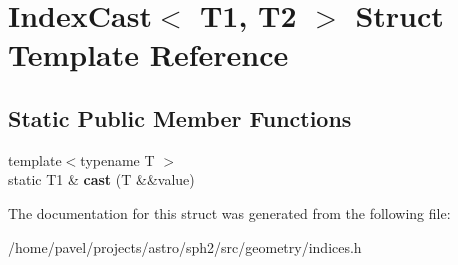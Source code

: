 \hypertarget{structIndexCast}{}\section{Index\+Cast$<$ T1, T2 $>$ Struct Template Reference}
\label{structIndexCast}
\subsection*{Static Public Member Functions}
\begin{DoxyCompactItemize}
\item 
\hypertarget{structIndexCast_a4649faea0aea9ac405862853b3a4c748}{}\label{structIndexCast_a4649faea0aea9ac405862853b3a4c748} 
{\footnotesize template$<$typename T $>$ }\\static T1 \& {\bfseries cast} (T \&\&value)
\end{DoxyCompactItemize}


The documentation for this struct was generated from the following file\+:\begin{DoxyCompactItemize}
\item 
/home/pavel/projects/astro/sph2/src/geometry/indices.\+h\end{DoxyCompactItemize}
